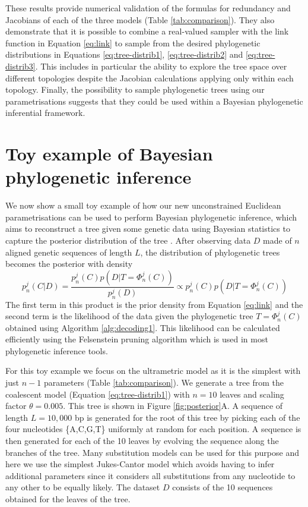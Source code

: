 \documentclass{article}
\begin{document}
These results provide numerical validation of the formulas for redundancy and
Jacobians of each of the three models (Table \ref{tab:comparison}). They also
demonstrate that it is possible to combine a real-valued sampler with the link function in 
Equation \ref{eq:link} to sample
from the desired phylogenetic distributions in Equations \ref{eq:tree-distrib1}, 
\ref{eq:tree-distrib2} and \ref{eq:tree-distrib3}. This includes in particular the ability
to explore the tree space over different topologies despite the Jacobian calculations 
applying only within each topology. 
Finally, the possibility to sample phylogenetic trees using our parametrisations
suggests that they could be used within a Bayesian phylogenetic inferential framework.

\section{Toy example of Bayesian phylogenetic inference}

We now show a small toy example of how our new unconstrained Euclidean
parametrisations can be used to perform Bayesian phylogenetic inference, which
aims to reconstruct
a tree given some genetic data using Bayesian statistics to capture
the posterior distribution of the tree \citep{nascimentoBiologistsGuideBayesian2017}.
After observing data $D$ made of $n$ aligned genetic sequences of length $L$, the 
distribution of phylogenetic trees becomes the posterior with density
\begin{equation}\label{eq:posterior}
p_n^j(C|D)=\frac{p_n^j(C) p(D|T=\Phi^j_n(C))}{p_n^j(D)} \propto p_n^j(C) p(D|T=\Phi^j_n(C))
\end{equation}
The first term in this product is the prior density from Equation \ref{eq:link} and the 
second term is the likelihood of the data given the phylogenetic tree $T=\Phi_n^j(C)$
obtained using Algorithm \ref{alg:decoding1}. This likelihood can be calculated efficiently
using the Felsenstein pruning algorithm \citep{Felsenstein1981} which is used in
most phylogenetic inference tools. 

For this toy example we focus on the ultrametric model as it is the simplest with
just $n-1$ parameters (Table \ref{tab:comparison}). We generate a tree from the 
coalescent model (Equation \ref{eq:tree-distrib1}) with $n=10$ leaves and 
scaling factor $\theta=0.005$. This tree is shown in Figure \ref{fig:posterior}A. 
A sequence of length $L=10,000$ bp is generated for the root of this tree by
picking each of the four nucleotides \{A,C,G,T\} uniformly at random for each position.
A sequence is then generated for each of the 10 leaves by evolving the sequence
along the branches of the tree. 
Many substitution models can be used for this purpose \citep{nascimentoBiologistsGuideBayesian2017} and here we use the simplest 
Jukes-Cantor model \citep{Jukes1969} which avoids having to infer additional
parameters since it considers all substitutions from any nucleotide to any other
to be equally likely. The dataset $D$ consists of the 10 sequences obtained for the
leaves of the tree.
\end{document}
